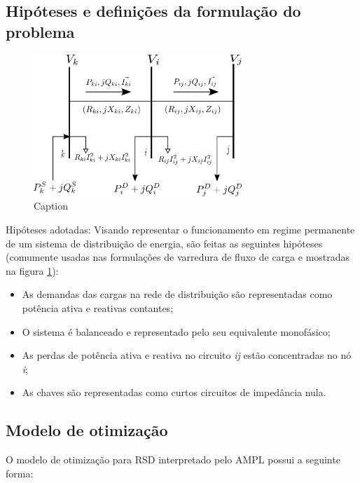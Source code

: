 \subsection{Hipóteses e definições da formulação do problema}

\begin{figure}[H]
    \centering
    \includegraphics[width=0.7\textwidth]{3_Methodology/diagrama_nos.png}
    \caption{Caption}
    \label{fig:SDR}
\end{figure}

Hipóteses adotadas:
Visando representar o funcionamento em regime permanente de um sistema de distribuição de energia, são feitas as seguintes hipóteses (comumente usadas nas formulações de varredura de fluxo de carga \cite{Shirmohammadi1988ANetworks} e mostradas na figura \ref{fig:SDR}):

\begin{itemize}
    \item As demandas das cargas na rede de distribuição são representadas como potência ativa e reativas contantes;

    \item O sistema é balanceado e representado pelo seu equivalente monofásico;
    
    \item As perdas de potência ativa e reativa no circuito \textit{ij} estão concentradas no nó \textit{i};
    
    \item As chaves são representadas como curtos circuitos de impedância nula.
\end{itemize}

\subsection{Modelo de otimização}

O modelo de otimização para RSD interpretado pelo AMPL possui a seguinte forma:

